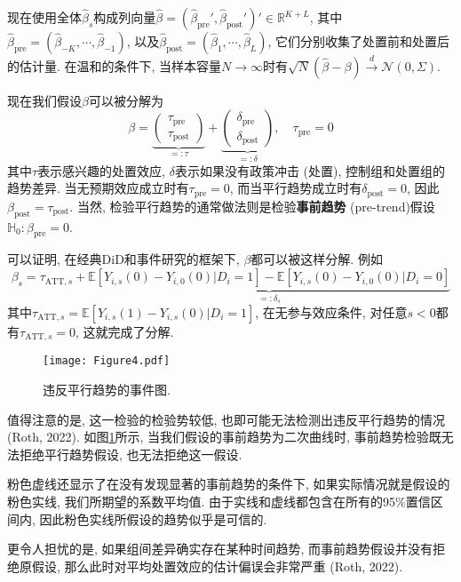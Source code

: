 \documentclass[cn,blue,14pt,screen,bibstyle=gb7714-2015]{elegantnote}
\newcommand{\E}{\mathbb{E}}
\begin{document}
现在使用全体$\hat{\beta}_s$构成列向量$\hat{\beta}=(\hat{\beta}_{\text{pre}}',\hat{\beta}_{\text{post}}')'\in\mathbb{R}^{K+L}$, 其中$\hat{\beta}_\text{pre}=(\hat{\beta}_{-K},\cdots,\hat{\beta}_{-1})$, 以及$\hat{\beta}_{\text{post}}=(\hat{\beta}_1,\cdots,\hat{\beta}_L)$, 它们分别收集了处置前和处置后的估计量. 在温和的条件下, 当样本容量$N\to\infty$时有$\sqrt{N}(\hat{\beta}-\beta)\xrightarrow{d}\mathcal{N}(0,\Sigma)$.

现在我们假设$\beta$可以被分解为
$$\beta=\underbrace{\begin{pmatrix}
          \tau_\text{pre} \\
          \tau_\text{post}
        \end{pmatrix}}_{=:\tau}+\underbrace{\begin{pmatrix}
          \delta_\text{pre} \\
          \delta_\text{post}
        \end{pmatrix}}_{=:\delta},\quad \tau_\text{pre}=0$$
其中$\tau$表示感兴趣的处置效应, $\delta$表示如果没有政策冲击 (处置), 控制组和处置组的趋势差异. 当无预期效应成立时有$\tau_\text{pre}=0$, 而当平行趋势成立时有$\delta_\text{post}=0$, 因此$\beta_\text{post}=\tau_\text{post}$. 当然, 检验平行趋势的通常做法则是检验\textbf{事前趋势} (pre-trend)假设$\mathbb{H} _0:\beta_\text{pre}=0$.

可以证明, 在经典DiD和事件研究的框架下, $\beta$都可以被这样分解. 例如
$$\beta_s=\tau_{\text{ATT},s}+\underbrace{\E[Y_{i,s}(0)-Y_{i,0}(0)|D_i=1]-\E[Y_{i,s}(0)-Y_{i,0}(0)|D_i=0]}_{=:\delta_s}$$
其中$\tau_{\text{ATT},s}=\E[Y_{i,s}(1)-Y_{i,s}(0)|D_i=1]$, 在无参与效应条件, 对任意$s<0$都有$\tau_{\text{ATT},s}=0$, 这就完成了分解.

\begin{figure}[htbp!]
  \centering
  \texttt{[image: Figure4.pdf]}
  \caption{违反平行趋势的事件图.}\label{Figure4}
\end{figure}

值得注意的是, 这一检验的检验势较低, 也即可能无法检测出违反平行趋势的情况 (Roth, 2022). 如图\ref{Figure4}所示, 当我们假设的事前趋势为二次曲线时, 事前趋势检验既无法拒绝平行趋势假设, 也无法拒绝这一假设.

粉色虚线还显示了在没有发现显著的事前趋势的条件下, 如果实际情况就是假设的粉色实线, 我们所期望的系数平均值. 由于实线和虚线都包含在所有的95\%置信区间内, 因此粉色实线所假设的趋势似乎是可信的.

更令人担忧的是, 如果组间差异确实存在某种时间趋势, 而事前趋势假设并没有拒绝原假设, 那么此时对平均处置效应的估计偏误会非常严重 (Roth, 2022).
\end{document}
